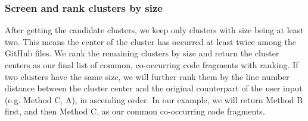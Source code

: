 \subsubsection{Screen and rank clusters by size}
After getting the candidate clusters, we keep only clusters with size being at least two. This means the center of the cluster has occurred at least twice among the GitHub files.
We rank the remaining clusters by size and return the cluster centers as our final list of common, co-occurring code fragments with ranking. If two clusters have the same size, we will further rank them by the line number distance between the cluster center and the original counterpart of the user input (e.g. {\ttt Method C, A}), in ascending order. In our example, we will return {\ttt Method B} first, and then {\ttt Method C}, as our common co-occurring code fragments.